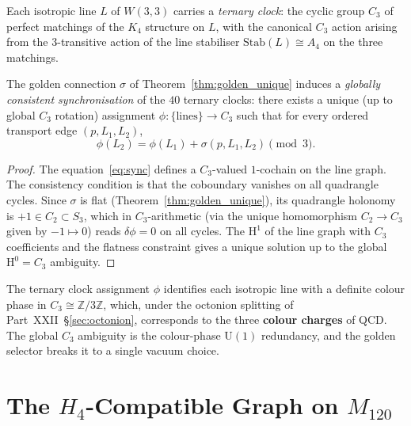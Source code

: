 \begin{definition}
\label{def:ternary_clock}
Each isotropic line $L$ of $W(3,3)$ carries a \emph{ternary clock}:
the cyclic group $C_3$ of perfect matchings of the $K_4$ structure
on $L$, with the canonical $C_3$ action arising from the
$3$-transitive action of the line stabiliser $\mathrm{Stab}(L)\cong
A_4$ on the three matchings.
\end{definition}

\begin{theorem}
\label{thm:sync}
The golden connection $\sigma$ of Theorem~\ref{thm:golden_unique}
induces a \emph{globally consistent synchronisation} of the $40$
ternary clocks: there exists a unique (up to global $C_3$ rotation)
assignment $\phi: \{\text{lines}\}\to C_3$ such that for every
ordered transport edge $(p,L_1,L_2)$,
\begin{equation}
  \phi(L_2) = \phi(L_1) + \sigma(p,L_1,L_2) \pmod{3}.
  \label{eq:sync}
\end{equation}
\end{theorem}

\begin{proof}
The equation~\eqref{eq:sync} defines a $C_3$-valued $1$-cochain on the
line graph.  The consistency condition is that the coboundary vanishes
on all quadrangle cycles.  Since $\sigma$ is flat (Theorem~\ref{thm:golden_unique}),
its quadrangle holonomy is $+1\in C_2\subset S_3$, which in
$C_3$-arithmetic (via the unique homomorphism $C_2\to C_3$ given
by $-1\mapsto 0$) reads $\delta\phi=0$ on all cycles.  The
$\mathrm{H}^1$ of the line graph with $C_3$ coefficients and the
flatness constraint gives a unique solution up to the global
$\mathrm{H}^0=C_3$ ambiguity.
\qedhere
\end{proof}

\begin{corollary}
\label{cor:sync_phys}
The ternary clock assignment $\phi$ identifies each isotropic line
with a definite colour phase in $C_3\cong\mathbb{Z}/3\mathbb{Z}$,
which, under the octonion splitting of Part~XXII~\S\ref{sec:octonion},
corresponds to the three \textbf{colour charges} of QCD.
The global $C_3$ ambiguity is the colour-phase $\mathrm{U}(1)$
redundancy, and the golden selector breaks it to a single vacuum
choice.
\end{corollary}

\section{The $H_4$-Compatible Graph on $M_{120}$}
\label{sec:h4_graph}

